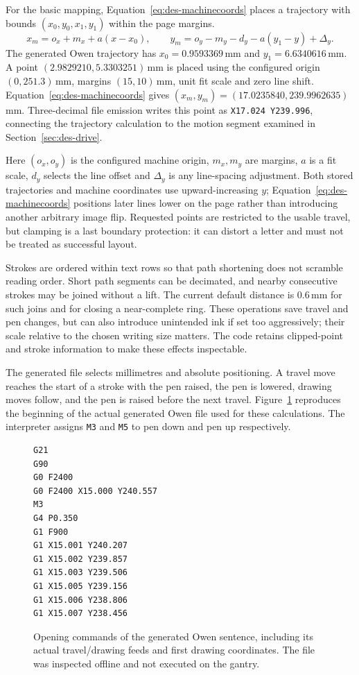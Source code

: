 For the basic mapping, Equation~\ref{eq:des-machinecoords} places a trajectory with bounds $(x_0,y_0,x_1,y_1)$ within the page margins.
\begin{equation}
x_m=o_x+m_x+a(x-x_0),\qquad
y_m=o_y-m_y-d_y-a(y_1-y)+\Delta_y.
\label{eq:des-machinecoords}
\end{equation}
The generated Owen trajectory has $x_0=0.9593369$\,mm and $y_1=6.6340616$\,mm. A point $(2.9829210,5.3303251)$\,mm is placed using the configured origin $(0,251.3)$\,mm, margins $(15,10)$\,mm, unit fit scale and zero line shift. Equation~\ref{eq:des-machinecoords} gives $(x_m,y_m)=(17.0235840,239.9962635)$\,mm. Three-decimal file emission writes this point as \texttt{X17.024 Y239.996}, connecting the trajectory calculation to the motion segment examined in Section~\ref{sec:des-drive}.

Here $(o_x,o_y)$ is the configured machine origin, $m_x,m_y$ are margins, $a$ is a fit scale, $d_y$ selects the line offset and $\Delta_y$ is any line-spacing adjustment. Both stored trajectories and machine coordinates use upward-increasing $y$; Equation~\ref{eq:des-machinecoords} positions later lines lower on the page rather than introducing another arbitrary image flip. Requested points are restricted to the usable travel, but clamping is a last boundary protection: it can distort a letter and must not be treated as successful layout.

Strokes are ordered within text rows so that path shortening does not scramble reading order. Short path segments can be decimated, and nearby consecutive strokes may be joined without a lift. The current default distance is 0.6\,mm for such joins and for closing a near-complete ring. These operations save travel and pen changes, but can also introduce unintended ink if set too aggressively; their scale relative to the chosen writing size matters. The code retains clipped-point and stroke information to make these effects inspectable.

The generated file selects millimetres and absolute positioning. A travel move reaches the start of a stroke with the pen raised, the pen is lowered, drawing moves follow, and the pen is raised before the next travel. Figure~\ref{fig:des-gcode-excerpt} reproduces the beginning of the actual generated Owen file used for these calculations. The interpreter assigns \texttt{M3} and \texttt{M5} to pen down and pen up respectively.


\begin{figure}[!htbp]
\begin{lstlisting}[style=designcode]
G21
G90
G0 F2400
G0 F2400 X15.000 Y240.557
M3
G4 P0.350
G1 F900
G1 X15.001 Y240.207
G1 X15.002 Y239.857
G1 X15.003 Y239.506
G1 X15.005 Y239.156
G1 X15.006 Y238.806
G1 X15.007 Y238.456
\end{lstlisting}
\caption{Opening commands of the generated Owen sentence, including its actual travel/drawing feeds and first drawing coordinates. The file was inspected offline and not executed on the gantry.}
\label{fig:des-gcode-excerpt}
\end{figure}

